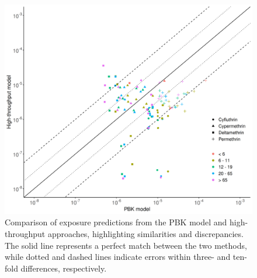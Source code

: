 \documentclass[toxics,article,submit,pdftex,moreauthors]{Definitions/mdpi}
\begin{document}
\begin{figure}[H]
\centering
\centering
\includegraphics[width=\linewidth]{figures/fig4}
\hfill
\caption{Comparison of exposure predictions from the PBK model and
high-throughput approaches, highlighting similarities and discrepancies. The
solid line represents a perfect match between the two methods, while dotted and
dashed lines indicate errors within three- and ten-fold differences,
respectively.\label{fig:fig4}}
\end{figure}
\end{document}
